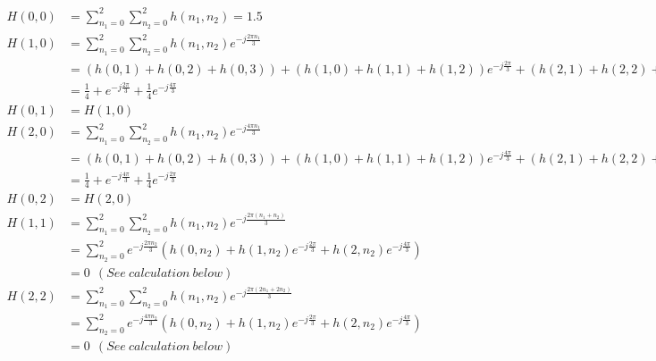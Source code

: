 \documentclass[11pt]{article}
\begin{document}
\(\begin{align} H(0,0) &= \sum\limits_{n_1=0}^2\sum\limits_{n_2=0}^2 h(n_1,n_2) = 1.5 \tag{1}\\ H(1,0) &= \sum\limits_{n_1=0}^2\sum\limits_{n_2=0}^2 h(n_1,n_2) e^{-j{\frac{2\pi n_1}{3}}} \tag{2}\\ &= (h(0,1)+h(0,2)+h(0,3)) + (h(1,0)+h(1,1)+h(1,2))e^{-j\frac{2\pi}{3}} + (h(2,1)+h(2,2)+h(3,2))e^{-j\frac{4\pi}{3}} \nonumber\\ &= \frac{1}{4} + e^{-j\frac{2\pi}{3}} + \frac{1}{4}e^{-j\frac{4\pi}{3}} \nonumber\\ H(0,1) &= H(1,0) \tag{3}\\ H(2,0) &= \sum\limits_{n_1=0}^2\sum\limits_{n_2=0}^2 h(n_1,n_2) e^{-j{\frac{4\pi n_1}{3}}} \tag{4}\\ &= (h(0,1)+h(0,2)+h(0,3)) + (h(1,0)+h(1,1)+h(1,2))e^{-j\frac{4\pi}{3}} + (h(2,1)+h(2,2)+h(3,2))e^{-j\frac{8\pi}{3}} \nonumber\\ &= \frac{1}{4} + e^{-j\frac{4\pi}{3}} + \frac{1}{4}e^{-j\frac{2\pi}{3}} \nonumber\\ H(0,2) &= H(2,0) \tag{5}\\ H(1,1) &= \sum\limits_{n_1=0}^2\sum\limits_{n_2=0}^2 h(n_1,n_2) e^{-j{\frac{2\pi (n_1+n_2)}{3}}} \tag{6}\\ &= \sum\limits_{n_2=0}^2 e^{-j{\frac{2\pi n_2}{3}}} \left( h(0,n_2) + h(1,n_2) e^{-j{\frac{2\pi}{3}}} + h(2,n_2) e^{-j{\frac{4\pi}{3}}} \right) \nonumber \\ &= 0 \ \ (See \ calculation \ below)\nonumber \\ H(2,2) &= \sum\limits_{n_1=0}^2\sum\limits_{n_2=0}^2 h(n_1,n_2) e^{-j{\frac{2\pi (2n_1+2n_2)}{3}}} \tag{7}\\ &= \sum\limits_{n_2=0}^2 e^{-j{\frac{4\pi n_2}{3}}} \left( h(0,n_2) + h(1,n_2) e^{-j{\frac{2\pi}{3}}} + h(2,n_2) e^{-j{\frac{4\pi}{3}}} \right) \nonumber \\ &= 0 \ \ (See \ calculation \ below)\nonumber \\ \end{align}\)
\end{document}
